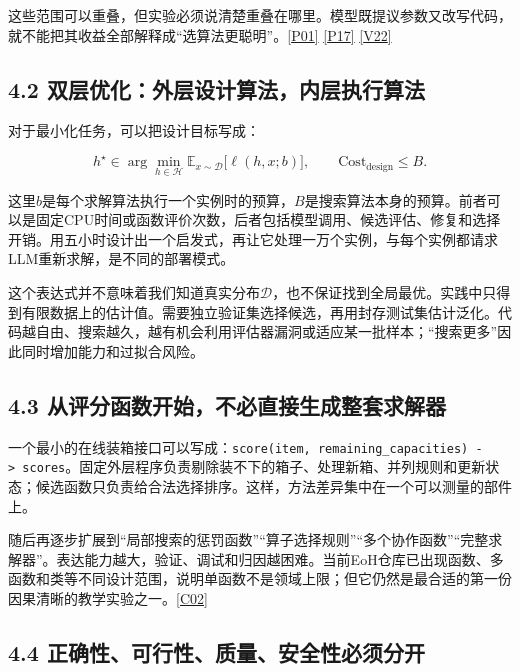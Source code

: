 这些范围可以重叠，但实验必须说清楚重叠在哪里。模型既提议参数又改写代码，就不能把其收益全部解释成``选算法更聪明''。\href{https://arxiv.org/abs/2410.14716v5}{{[}P01{]}}
\href{https://arxiv.org/abs/2108.07732}{{[}P17{]}}
\href{https://2023.automl.cc/program/tutorials/survey-of-methods/}{{[}V22{]}}

\subsection{4.2
双层优化：外层设计算法，内层执行算法}\label{ux53ccux5c42ux4f18ux5316ux5916ux5c42ux8bbeux8ba1ux7b97ux6cd5ux5185ux5c42ux6267ux884cux7b97ux6cd5}

对于最小化任务，可以把设计目标写成：

\[
h^\star\in\arg\min_{h\in\mathcal H}
\mathbb E_{x\sim\mathcal D}\bigl[\ell(h,x;b)\bigr],
\qquad \mathrm{Cost}_{\mathrm{design}}\le B.
\]

这里\(b\)是每个求解算法执行一个实例时的预算，\(B\)是搜索算法本身的预算。前者可以是固定CPU时间或函数评价次数，后者包括模型调用、候选评估、修复和选择开销。用五小时设计出一个启发式，再让它处理一万个实例，与每个实例都请求LLM重新求解，是不同的部署模式。

这个表达式并不意味着我们知道真实分布\(\mathcal D\)，也不保证找到全局最优。实践中只得到有限数据上的估计值。需要独立验证集选择候选，再用封存测试集估计泛化。代码越自由、搜索越久，越有机会利用评估器漏洞或适应某一批样本；``搜索更多''因此同时增加能力和过拟合风险。

\subsection{4.3
从评分函数开始，不必直接生成整套求解器}\label{ux4eceux8bc4ux5206ux51fdux6570ux5f00ux59cbux4e0dux5fc5ux76f4ux63a5ux751fux6210ux6574ux5957ux6c42ux89e3ux5668}

一个最小的在线装箱接口可以写成：\texttt{score(item,\ remaining\_capacities)\ -\textgreater{}\ scores}。固定外层程序负责剔除装不下的箱子、处理新箱、并列规则和更新状态；候选函数只负责给合法选择排序。这样，方法差异集中在一个可以测量的部件上。

随后再逐步扩展到``局部搜索的惩罚函数''``算子选择规则''``多个协作函数''``完整求解器''。表达能力越大，验证、调试和归因越困难。当前EoH仓库已出现函数、多函数和类等不同设计范围，说明单函数不是领域上限；但它仍然是最合适的第一份因果清晰的教学实验之一。\href{https://github.com/FeiLiu36/EoH}{{[}C02{]}}

\subsection{4.4
正确性、可行性、质量、安全性必须分开}\label{ux6b63ux786eux6027ux53efux884cux6027ux8d28ux91cfux5b89ux5168ux6027ux5fc5ux987bux5206ux5f00}

